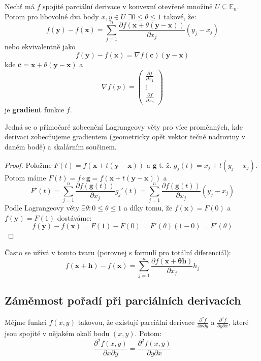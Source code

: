 \documentclass[../main.tex]{subfiles}
\begin{document}
\begin{theorem}\label{lagrange1}
	Nechť má $f$ spojité parciální derivace v konvexní otevřené množině $U \subseteq \mathbb{E}_{n}$.
	Potom pro libovolné dva body $x,y \in U$ $\exists 0 \leq \theta \leq 1$ takové, že:
	\[ f(\mathbf{y}) - f(\mathbf{x}) = \sum^{n}_{j=1} \frac{\partial f(\mathbf{x} + \theta (\mathbf{y}-\mathbf{x}))}{\partial x_j}(y_j - x_j) \]
	nebo ekvivalentně jako
	\[ f(\mathbf{y}) - f(\mathbf{x}) = \nabla f(\textbf{c}) (\textbf{y} - \textbf{x}) \]
	kde \(\textbf{c} = \mathbf{x} + \theta (\mathbf{y}-\mathbf{x})\) a \[\nabla f(p) = \begin{pmatrix} \frac{\partial f}{\partial x_1} \\[6pt] \vdots \\[6pt] \frac{\partial f}{\partial x_n} \end{pmatrix}\] je \textbf{gradient} funkce \(f\).
\end{theorem}

\begin{intuition}
	Jedná se o přímočaré zobecnění Lagrangeovy věty pro více proměnných, kde derivaci zobecňujeme gradientem (geometricky opět vektor tečné nadroviny v daném bodě) a skalárním součinem.
\end{intuition}

\begin{proof}
	Položme $F(t) = f(\mathbf{x} + t(\mathbf{y} - \mathbf{x}))$ a $\mathbf{g}$ t. ž. $g_j(t) = x_j + t(y_j - x_j)$.
	Potom máme $F(t) = f \circ \mathbf{g} = f(\mathbf{x} + t(\mathbf{y}-\mathbf{x}))$ a
	\[ F'(t) = \sum^{n}_{j=1} \frac{\partial f(\mathbf{g}(t))}{\partial x_j}g_j'(t) =
	\sum^{n}_{j=1} \frac{\partial f(\mathbf{g}(t))}{\partial x_j}(y_j - x_j)  \]
	Podle Lagrangeovy věty $\exists \theta : 0 \leq \theta \leq 1$ a díky tomu, že $f(\mathbf{x}) = F(0)$ a $f(\mathbf{y}) = F(1)$ dostáváme:
	\[ f(\mathbf{y}) - f(\mathbf{x}) = F(1) - F(0) = F'(\theta)(1 - 0) = F'(\theta) \]
\end{proof}


\begin{remark}
	Často se užívá v tomto tvaru (porovnej s formulí pro totální diferenciál):
	\[ f(\mathbf{x} + \mathbf{h}) - f(\mathbf{x}) =
	\sum^{n}_{j=1} \frac{\partial f(\mathbf{x + \theta \mathbf{h}})}{\partial x_j}h_j \]
\end{remark}

\subsection{Záměnnost pořadí při parciálních derivacích}
\begin{lemma}[O záměnnosti]
	Mějme funkci $f(x,y)$ takovou, že existují parciální derivace
	$\frac{\partial ^2 f}{\partial x \partial y}$ a $\frac{\partial ^2 f}{\partial y \partial x}$, které
	jsou spojité v nějakém okolí bodu $(x,y)$. Potom:
	\[ \frac{\partial ^2 f(x,y)}{\partial x \partial y} = \frac{\partial ^2 f(x,y)}{\partial y \partial x} \]
\end{lemma}
\end{document}

